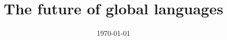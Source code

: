 \documentclass{mcmthesis}
\title{The future of global languages} %
\author{\small \href{http://www.latexstudio.net/}
  {\graphics[width=7cm]{mcmthesis-logo}}}
\date{\today}
\begin{document}
\restoregeometry %
\maketitle  %
\tableofcontents %
\newpage %


 
\end{document}
